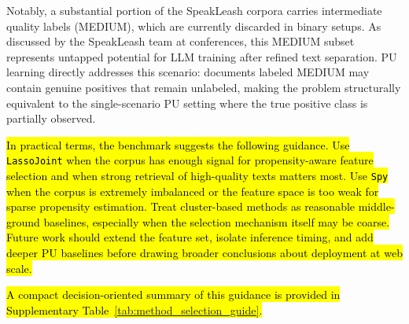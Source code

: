\documentclass[applsci,article,submit,pdftex,moreauthors]{Definitions/mdpi}
\newcommand{\rev}[1]{\hl{#1}}
\begin{document}
Notably, a substantial portion of the SpeakLeash corpora carries intermediate quality labels (MEDIUM), which are currently discarded in binary setups. As discussed by the SpeakLeash team at conferences, this MEDIUM subset represents untapped potential for LLM training after refined text separation. PU learning directly addresses this scenario: documents labeled MEDIUM may contain genuine positives that remain unlabeled, making the problem structurally equivalent to the single-scenario PU setting where the true positive class is partially observed.

\rev{In practical terms, the benchmark suggests the following guidance. Use \texttt{LassoJoint} when the corpus has enough signal for propensity-aware feature selection and when strong retrieval of high-quality texts matters most. Use \texttt{Spy} when the corpus is extremely imbalanced or the feature space is too weak for sparse propensity estimation. Treat cluster-based methods as reasonable middle-ground baselines, especially when the selection mechanism itself may be coarse. Future work should extend the feature set, isolate inference timing, and add deeper PU baselines before drawing broader conclusions about deployment at web scale.}

\rev{A compact decision-oriented summary of this guidance is provided in Supplementary Table~\ref{tab:method_selection_guide}.}
\end{document}
